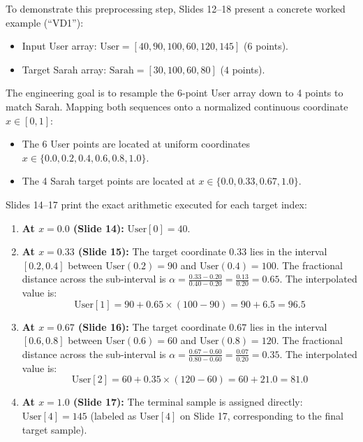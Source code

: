 \documentclass[11pt,a4paper]{article}
\begin{document}
To demonstrate this preprocessing step, Slides 12--18 present a concrete worked example (``VD1''):
\begin{itemize}
    \item Input User array: $\text{User} = [40, 90, 100, 60, 120, 145]$ ($6$ points).
    \item Target Sarah array: $\text{Sarah} = [30, 100, 60, 80]$ ($4$ points).
\end{itemize}
The engineering goal is to resample the 6-point User array down to 4 points to match Sarah. Mapping both sequences onto a normalized continuous coordinate $x \in [0, 1]$:
\begin{itemize}
    \item The 6 User points are located at uniform coordinates $x \in \{0.0, 0.2, 0.4, 0.6, 0.8, 1.0\}$.
    \item The 4 Sarah target points are located at $x \in \{0.0, 0.33, 0.67, 1.0\}$.
\end{itemize}
Slides 14--17 print the exact arithmetic executed for each target index:
\begin{enumerate}
    \item \textbf{At $x = 0.0$ (Slide 14):} $\text{User}[0] = 40$.
    \item \textbf{At $x = 0.33$ (Slide 15):} The target coordinate $0.33$ lies in the interval $[0.2, 0.4]$ between $\text{User}(0.2) = 90$ and $\text{User}(0.4) = 100$. The fractional distance across the sub-interval is $\alpha = \frac{0.33 - 0.20}{0.40 - 0.20} = \frac{0.13}{0.20} = 0.65$. The interpolated value is:
    \begin{equation}
    \text{User}[1] = 90 + 0.65 \times (100 - 90) = 90 + 6.5 = 96.5
    \end{equation}
    \item \textbf{At $x = 0.67$ (Slide 16):} The target coordinate $0.67$ lies in the interval $[0.6, 0.8]$ between $\text{User}(0.6) = 60$ and $\text{User}(0.8) = 120$. The fractional distance across the sub-interval is $\alpha = \frac{0.67 - 0.60}{0.80 - 0.60} = \frac{0.07}{0.20} = 0.35$. The interpolated value is:
    \begin{equation}
    \text{User}[2] = 60 + 0.35 \times (120 - 60) = 60 + 21.0 = 81.0
    \end{equation}
    \item \textbf{At $x = 1.0$ (Slide 17):} The terminal sample is assigned directly: $\text{User}[4] = 145$ (labeled as $\text{User}[4]$ on Slide 17, corresponding to the final target sample).
\end{enumerate}
\end{document}
